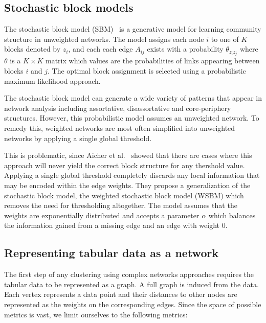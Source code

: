 \documentclass[conference]{IEEEtran}
\begin{document}
\subsection{Stochastic block models}

The stochastic block model (SBM)~\cite{holland1983stochastic} is a generative model for learning community structure in unweighted networks. The model assigns each node $i$ to one of $K$ blocks denoted by $z_i$, and each each edge $A_{ij}$ exists with a probability $\theta_{z_i z_j}$ where $\theta$ is a $K \times K$ matrix which values are the probabilities of links appearing between blocks $i$ and $j$. The optimal block assignment is selected using a probabilistic maximum likelihood approach.

The stochastic block model can generate a wide variety of patterns that appear in network analysis including assortative, disassortative and core-periphery structures. However, this probabilistic model assumes an unweighted network. To remedy this, weighted networks are most often simplified into unweighted networks by applying a single global threshold.

This is problematic, since Aicher et al.~\cite{aicher2013adapting} showed that there are cases where this approach will never yield the correct block structure for any thershold value. Applying a single global threshold completely discards any local information that may be encoded within the edge weights. They propose a generalization of the stochastic block model, the weighted stochastic block model (WSBM) which removes the need for thresholding altogether. The model assumes that the weights are exponentially distributed and accepts a parameter $\alpha$ which balances the information gained from a missing edge and an edge with weight 0.

\subsection{Representing tabular data as a network}

The first step of any clustering using complex networks approaches requires the tabular data to be represented as a graph. A full graph is induced from the data. Each vertex represents a data point and their distances to other nodes are represented as the weights on the corresponding edges. Since the space of possible metrics is vast, we limit ourselves to the following metrics:
\end{document}
